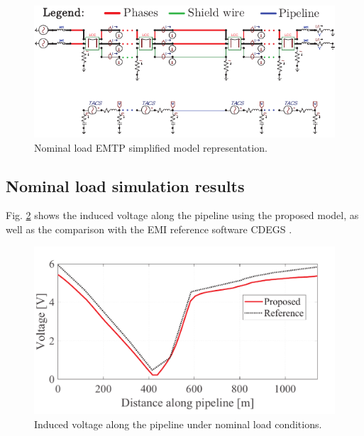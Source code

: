 \documentclass{IEEEtran4PSCC}
\begin{document}
\begin{figure}[hbt]
	\begin{center}
		\includegraphics[width=1\columnwidth]{./fig/NL_circuit2.pdf}
		\caption{Nominal load EMTP simplified model representation.}
		\label{fig:NLcircuit}
	\end{center}
\end{figure}

\subsection{Nominal load simulation results}

Fig. \ref{fig:NLvoltage} shows the induced voltage along the pipeline using the proposed model, as well as the comparison with the EMI reference software CDEGS \cite{Dawalibi1984a}. 

\begin{figure}[hbt]
	\begin{center}
		\includegraphics[width=1\columnwidth]{./fig/NL_voltage2.pdf}
		\caption{Induced voltage along the pipeline under nominal load conditions.}
		\label{fig:NLvoltage}
	\end{center}
\end{figure}
\end{document}
